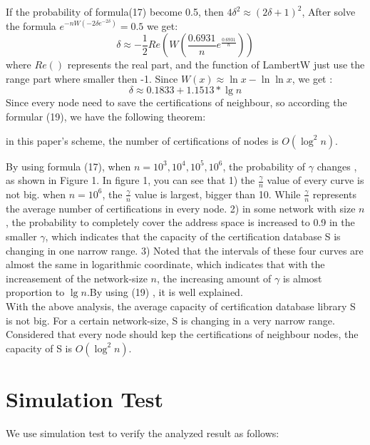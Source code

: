 \documentclass[10pt]{article}
\begin{document}
If the probability of formula(17) become 0.5, then $4\delta^{2}\approx (2\delta +1)^2$, After solve the formula $e^{-nW(-2\delta e^{-2\delta})}=0.5$ we get:
\begin{equation}
    \delta \approx -\frac{1}{2}Re(W(\frac{0.6931}{n}e^{\frac{0.6931}{n}}))
\end{equation}
where $Re()$ represents the real part, and the function of LambertW just use the range part where smaller then -1. Since $W(x)\approx \ln x- \ln \ln x$, we get :
\begin{equation}
\delta \approx0.1833+1.1513*\lg n
\end{equation}
Since every node need to save the certifications of neighbour, so according the formular (19),  we have the following theorem: 
\begin{theorem}
in this paper's scheme, the number of certifications of nodes is $O (\log ^2 n)$.
\end{theorem}
By using formula (17), when $n=10^3,10^4,10^5,10^6$, the probability of $\gamma$  changes , as shown in Figure 1. In figure 1, you can see that 1) the $\frac{\gamma}{n}$  value of every curve is not big. when $n=10^6$, the $\frac{\gamma}{n}$ value is largest, bigger than 10. While $\frac{\gamma}{n}$  represents the average number of certifications in every node. 2) in some network with size $n$, the probability to completely cover the address space is increased to 0.9 in the smaller $\gamma$, which indicates that the capacity of the certification database S is changing in one narrow range. 3) Noted that the intervals of these four curves are almost the same in logarithmic coordinate, which indicates that with the increasement of the network-size $n$, the increasing amount of $\gamma$ is almost proportion to $\lg{n}$.By using (19) , it is well explained. \\
With the above analysis, the average capacity of certification database library S is not big. For a certain network-size, S is changing in a very narrow range. Considered that every node should kep the certifications of neighbour nodes, the capacity of S is $O(\log ^2{n})$.
\section{Simulation Test}
We use simulation test to verify the analyzed result as follows:
\end{document}
